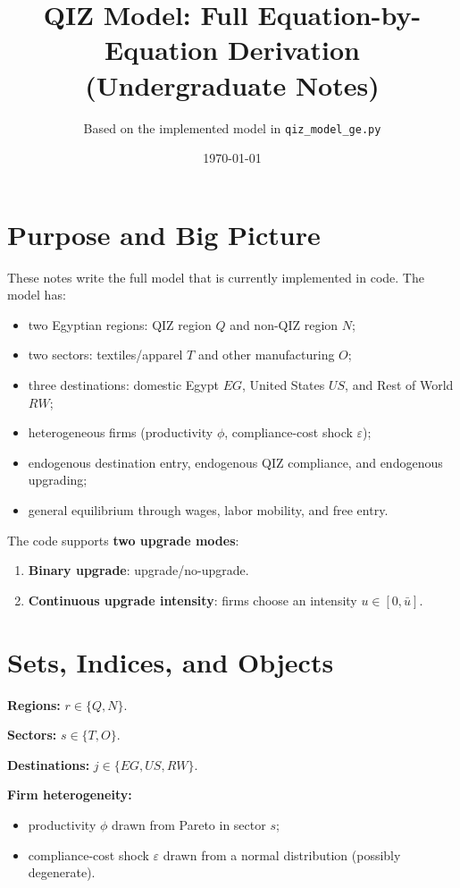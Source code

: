 \documentclass[11pt]{article}
\title{QIZ Model: Full Equation-by-Equation Derivation (Undergraduate Notes)}
\author{Based on the implemented model in \texttt{qiz\_model\_ge.py}}
\date{\today}
\begin{document}
\maketitle

\section{Purpose and Big Picture}
These notes write the full model that is currently implemented in code.
The model has:
\begin{itemize}
    \item two Egyptian regions: QIZ region $Q$ and non-QIZ region $N$;
    \item two sectors: textiles/apparel $T$ and other manufacturing $O$;
    \item three destinations: domestic Egypt $EG$, United States $US$, and Rest of World $RW$;
    \item heterogeneous firms (productivity $\phi$, compliance-cost shock $\varepsilon$);
    \item endogenous destination entry, endogenous QIZ compliance, and endogenous upgrading;
    \item general equilibrium through wages, labor mobility, and free entry.
\end{itemize}

The code supports \textbf{two upgrade modes}:
\begin{enumerate}
    \item \textbf{Binary upgrade}: upgrade/no-upgrade.
    \item \textbf{Continuous upgrade intensity}: firms choose an intensity $u \in [0,\bar u]$.
\end{enumerate}

\section{Sets, Indices, and Objects}
\textbf{Regions:} $r \in \{Q,N\}$.

\textbf{Sectors:} $s \in \{T,O\}$.

\textbf{Destinations:} $j \in \{EG,US,RW\}$.

\textbf{Firm heterogeneity:}
\begin{itemize}
    \item productivity $\phi$ drawn from Pareto in sector $s$;
    \item compliance-cost shock $\varepsilon$ drawn from a normal distribution (possibly degenerate).
\end{itemize}
\end{document}
